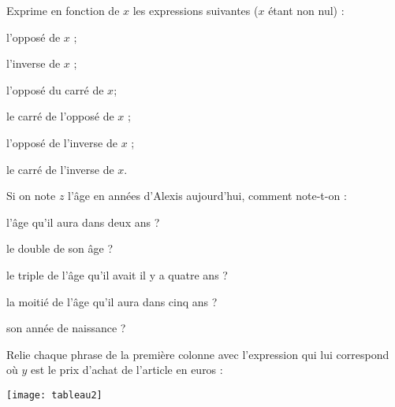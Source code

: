 


\begin{exercice}
Exprime en fonction de $x$ les expressions suivantes ($x$ étant non nul) :

\begin{colenumerate}{1} 
\item l'opposé de $x$ ;
\item l'inverse de $x$ ;	
\item l'opposé du carré de $x$;
\item le carré de l'opposé de $x$ ;	
\item l'opposé de l'inverse de $x$ ;
\item le carré de l'inverse de $x$.
\end{colenumerate} 
\end{exercice}

\begin{exercice}
Si on note $z$ l'âge en années d'Alexis aujourd'hui, comment note-t-on :

\begin{colenumerate}{1} 
\item l'âge qu'il aura dans deux ans ?
\item le double de son âge ?
\item le triple de l'âge qu'il avait il y a quatre ans ?
\item la moitié de l'âge qu'il aura dans cinq ans ?
\item son année de naissance ?
\end{colenumerate} 
\end{exercice}

\begin{exercice}
Relie chaque phrase de la première colonne avec l'expression qui lui correspond où $y$ est le prix d'achat de l'article en euros :
\begin{center}
    \texttt{[image: tableau2]}
\end{center}
\end{exercice}

